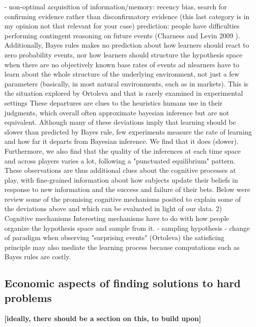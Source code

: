 {- non-optimal acquisition of information/memory: recency bias, search for confirming evidence rather than disconfirmatory evidence (this last category is in my opinion not that relevant for your case) prediction: people have difficulties performing contingent reasoning on future events (Charness and Levin 2009 \cite{charness2009origin}). Additionally, Bayes rules makes no prediction about how learners should react to zero probability events, nor how learners should structure the hypothesis space when there are no objectively known base rates of events ad nlearners have to learn about the whole structure of the underlying environment, not just a few parameters (basically, in most natural environments, such as in markets). This is the situation explored by Ortoleva \cite{ortoleva2012modeling} and that is rarely examined in experimental settings  These departures are clues to the heuristics humans use in their judgments, which overall often approximate bayesian inference but are not equivalent. Although many of these deviations imply that learning should be slower than predicted by Bayes rule,  few experiments measure the rate of learning and how far it departs from Bayesian inference. We find that it does (slower). Furthermore, we also find that the quality of the inferences at each time space and across players varies a lot, following a "punctuated equilibrium" pattern. These observations are thus additional clues about the cognitive processes at play, with fine-grained information about how subjects update their beliefs in response to new information and the success and failure of their bets. Below were review some of the promising cognitive mechanisms posited to explain some of the deviations above and which can be evaluated in light of our data. 2) Cognitive mechanisms  Interesting mechanisms have to do with how people organize the hypothesis space and sample from it.  - sampling hypothesis - change of paradigm when observing "surprising events" (Ortoleva) \cite{ortoleva2012modeling} the satisficing principle may also mediate the learning process because computations such as Bayes rules are costly.
}

\subsection{Economic aspects of finding solutions to hard problems}

{\bf [ideally, there should be a section on this, to build upon]}
